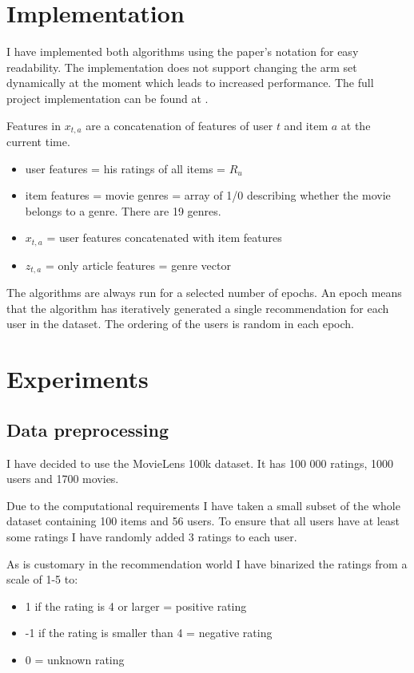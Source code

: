 \documentclass[12pt, titlepage]{article}
\begin{document}
\section{Implementation}\label{sec:impl}
I have implemented both algorithms using the paper's notation for easy readability. The implementation does not support changing the arm set dynamically at the moment which leads to increased performance. The full project implementation can be found at \cite{cit:impl}.

Features in $x_{t,a}$ are a concatenation of features of user $t$ and item $a$ at the current time.

\begin{itemize}
\item user features = his ratings of all items = $R_u$
\item item features = movie genres = array of 1/0 describing whether the movie belongs to a genre. There are 19 genres.
\item $x_{t,a}$ = user features concatenated with item features
\item $z_{t,a}$ = only article features = genre vector
\end{itemize}

The algorithms are always run for a selected number of epochs.
An epoch means that the algorithm has iteratively generated a single recommendation for each user in the dataset. The ordering of the users is random in each epoch.


\section{Experiments}\label{sec:exp}

\subsection{Data preprocessing}
I have decided to use the MovieLens 100k dataset. 
It has 100 000 ratings, 1000 users and 1700 movies. \cite{cit:ml}

Due to the computational requirements I have taken a small subset of the whole dataset containing 100 items and 56 users. To ensure that all users have at least some ratings I have randomly added 3 ratings to each user.

As is customary in the recommendation world I have binarized the ratings from a scale of 1-5 to:

\begin{itemize}
\item 1 if the rating is 4 or larger = positive rating
\item -1 if the rating is smaller than 4 = negative rating
\item 0 = unknown rating
\end{itemize}
\end{document}
